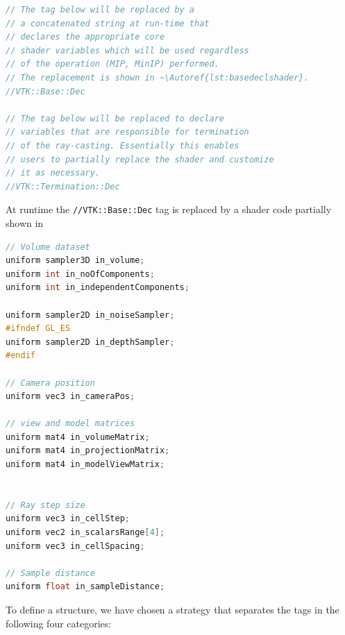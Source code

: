\begin{lstlisting}[language=C++, caption={Fragment shader tags},
                   captionpos=b, frame=single, breaklines=true,
                   label=lst:skeletonshader]
// The tag below will be replaced by a
// a concatenated string at run-time that
// declares the appropriate core
// shader variables which will be used regardless
// of the operation (MIP, MinIP) performed.
// The replacement is shown in ~\Autoref{lst:basedeclshader}.
//VTK::Base::Dec

// The tag below will be replaced to declare
// variables that are responsible for termination
// of the ray-casting. Essentially this enables
// users to partially replace the shader and customize
// it as necessary.
//VTK::Termination::Dec

\end{lstlisting}

At runtime the \texttt{//VTK::Base::Dec} tag is replaced by a
shader code partially shown in~

\begin{lstlisting}[language=C++, caption={Base declaration fragment code},
                   captionpos=b, frame=single, breaklines=true,
                   label=lst:basedeclshader]
// Volume dataset
uniform sampler3D in_volume;
uniform int in_noOfComponents;
uniform int in_independentComponents;

uniform sampler2D in_noiseSampler;
#ifndef GL_ES
uniform sampler2D in_depthSampler;
#endif

// Camera position
uniform vec3 in_cameraPos;

// view and model matrices
uniform mat4 in_volumeMatrix;
uniform mat4 in_projectionMatrix;
uniform mat4 in_modelViewMatrix;


// Ray step size
uniform vec3 in_cellStep;
uniform vec2 in_scalarsRange[4];
uniform vec3 in_cellSpacing;

// Sample distance
uniform float in_sampleDistance;
\end{lstlisting}

To define a structure, we have chosen a strategy that separates the tags in
the following four categories:

